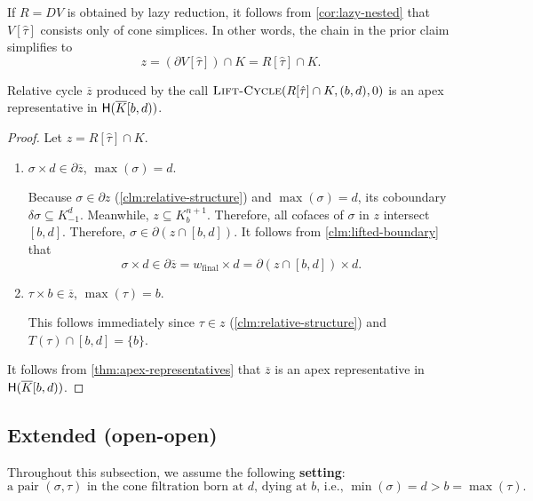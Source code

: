 \documentclass[cleveref,a4paper,english,nolineno]{socg-lipics-v2021}
\newcommand{\Hgr}{{\sf H}}
\newcommand{\prism}[1]{\overline{#1}}
\newcommand{\cone}[1]{\hat{#1}}
\newcommand{\bdry}{\partial}
\newcommand{\cbdry}{\delta}
\newcommand{\pK}{\prism{K}}
\newcommand{\pz}{\prism{z}}
\newcommand{\subK}[1]{K_{-1}^{#1}}
\newcommand{\supK}[1]{K_{#1}^{n+1}}
\newcommand{\ssx}{\sigma}
\newcommand{\tsx}{\tau}
\newcommand{\ctsx}{\cone{\tsx}}
\newcommand{\algname}[1]{\textsc{#1}}
\newcommand{\wfinal}{w_\textrm{final}}
\begin{document}
    \begin{remark}
        If $R = DV$ is obtained by lazy reduction, it follows from
        \cref{cor:lazy-nested} that $V[\ctsx]$ consists only of cone simplices.
        In other words, the chain in the prior claim simplifies to
        \[
            z = \left( \bdry V[\ctsx] \right) \cap K = R[\ctsx] \cap K.
        \]
    \end{remark}

\begin{claim}%
    \label{clm:relative-correct}
    Relative cycle $\pz$ produced by the call $\algname{Lift-Cycle}(R[\ctsx] \cap K, (b,d), 0)$
    is an apex representative in $\Hgr(\pK[b,d))$.
\end{claim}
\begin{proof}
    Let $z = R[\ctsx] \cap K$.
    \begin{enumerate}
        \item
            $\ssx \times d \in \bdry \pz$, $\max(\ssx) = d$.

            Because $\ssx \in \bdry z$ (\cref{clm:relative-structure}) and $\max(\ssx) = d$, its coboundary
            $\cbdry \ssx \subseteq \subK{d}$. Meanwhile, $z \subseteq \supK{b}$. Therefore,
            all cofaces of $\ssx$ in $z$ intersect $[b,d]$. Therefore, $\ssx \in
            \bdry \left( z \cap [b,d] \right)$. It follows from
            \cref{clm:lifted-boundary} that
            \[
                \ssx \times d \in \bdry \pz
                    = \wfinal \times d
                    = \bdry \left( z \cap [b,d] \right) \times d.
            \]

        \item
            $\tsx \times b \in \pz$, $\max(\tsx) = b$.

            This follows immediately since $\tsx \in z$ (\cref{clm:relative-structure}) and
            $T(\tsx) \cap [b,d] = \{ b \}$.
    \end{enumerate}
    It follows from \cref{thm:apex-representatives} that $\pz$ is
    an apex representative in $\Hgr(\pK[b,d))$.
\end{proof}


\subsection{Extended (open-open)}
\label{sec:extended-oo}

Throughout this subsection, we assume the following \textbf{setting}:
\[
    \text{a pair $(\ssx, \ctsx)$ in the cone filtration born at $d$, dying at $b$, i.e.,
    $\min(\ssx) = d > b = \max(\tsx)$.}
\]
\end{document}
